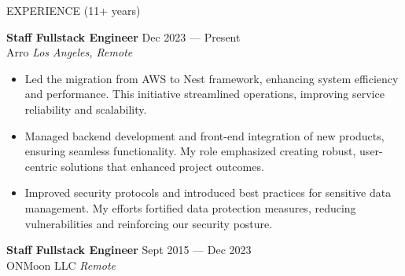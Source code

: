 \documentclass{template} %
\begin{document}
\begin{rSection}{EXPERIENCE (11+ years)}

\textbf{Staff Fullstack Engineer} \hfill Dec 2023 --- Present\\
Arro \hfill \textit{Los Angeles, Remote}
\begin{minipage}{0.95\textwidth}
 \begin{itemize}
    \vspace{0.1cm}
    \itemsep 1pt {}  
    \item Led the migration from AWS to Nest framework, enhancing system efficiency and performance. This initiative streamlined operations, improving service reliability and scalability.
    \item Managed backend development and front-end integration of new products, ensuring seamless functionality. My role emphasized creating robust, user-centric solutions that enhanced project outcomes.
    \item Improved security protocols and introduced best practices for sensitive data management. My efforts fortified data protection measures, reducing vulnerabilities and reinforcing our security posture.
 \end{itemize}
\end{minipage}

\textbf{Staff Fullstack Engineer} \hfill Sept 2015 --- Dec 2023\\
ONMoon LLC \hfill \textit{Remote}


\end{rSection}
\end{document}
